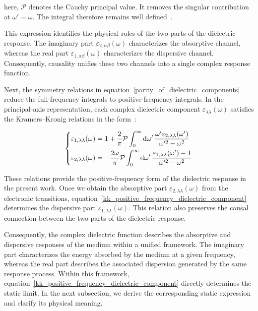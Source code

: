 here, $\mathcal{P}$ denotes the Cauchy principal value.
It removes the singular contribution at $\omega'=\omega$.
The integral therefore remains well defined~\cite{stefanski2022analytical,koutserimpas2024time}.

This expression identifies the physical roles of the two parts of the dielectric response.
The imaginary part $\varepsilon_{2,\alpha\beta}(\omega)$ characterizes the absorptive channel, 
whereas the real part $\varepsilon_{1,\alpha\beta}(\omega)$ characterizes the dispersive channel.
Consequently, causality unifies these two channels into a single complex response function.

Next, the symmetry relations in equation~\eqref{parity_of_dielectric_components} reduce the full-frequency integrals to positive-frequency integrals.
In the principal-axis representation,
each complex dielectric component $\varepsilon_{\lambda\lambda}(\omega)$ satisfies the Kramers--Kronig relations in the form~\cite{ossikovski2021constitutive}:

\begin{equation}
\left\{\begin{aligned}
    \varepsilon_{1,\lambda\lambda}(\omega) &=
    1+\frac{2}{\pi}\mathcal{P}
    \int_{0}^{\infty}\mathrm{d}{\omega'}\,
    \frac{\omega'\varepsilon_{2,\lambda\lambda}(\omega')}{\omega'^2-\omega^2} \\
    \varepsilon_{2,\lambda\lambda}(\omega) &=
    -\frac{2\omega}{\pi}\mathcal{P}
    \int_{0}^{\infty}\mathrm{d}{\omega'}\,
    \frac{\varepsilon_{1,\lambda\lambda}(\omega')-1}{\omega'^2-\omega^2}  
\end{aligned}\right.
\label{kk_positive_frequency_dielectric_component}
\end{equation}

These relations provide the positive-frequency form of the dielectric response in the present work.
Once we obtain the absorptive part $\varepsilon_{2,\lambda\lambda}(\omega)$ from the electronic transitions,
equation~\eqref{kk_positive_frequency_dielectric_component} determines the dispersive part $\varepsilon_{1,\lambda\lambda}(\omega)$.
This relation also preserves the causal connection between the two parts of the dielectric response.

Consequently, the complex dielectric function describes the absorptive
and dispersive responses of the medium within a unified framework.
The imaginary part characterizes the energy absorbed by the medium at a given frequency,
whereas the real part describes the associated dispersion generated by the same response process.
Within this framework, equation~\eqref{kk_positive_frequency_dielectric_component} directly determines the static limit.
In the next subsection, we derive the corresponding static expression and clarify its physical meaning.

